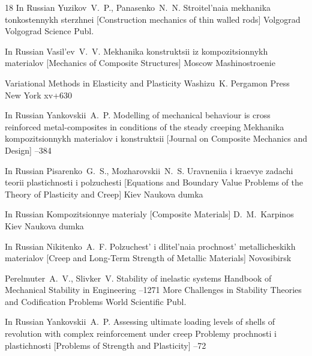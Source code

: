 \begin{thebibliography}{18}
\lang In Russian
\by Yuzikov~V.~P., Panasenko~N.~N.
\book Stroitel'naia mekhanika tonkostennykh sterzhnei \rm [Construction mechanics of thin walled rods]
\publaddr Volgograd
\publ Volgograd Science Publ.


\lang In Russian
\by Vasil'ev~V.~V.
\book Mekhanika konstruktsii iz kompozitsionnykh materialov \rm [Mechanics of Composite Structures]
\publaddr Moscow
\publ Mashinostroenie


\book Variational Methods in Elasticity and Plasticity
\by Washizu~K.
\publ Pergamon Press
\publaddr New York
\totalpages xv+630


\lang In Russian
\by Yankovskii~A.~P.
\paper Modelling of mechanical behaviour is cross reinforced metal-composites in conditions of the steady creeping
\jour Mekhanika kompozitsionnykh materialov i konstruktsii \rm [Journal on Composite Mechanics and Design]
--384


\lang In Russian
\by Pisarenko~G.~S., Mozharovskii~N.~S.
\book Uravneniia i kraevye zadachi teorii plastichnosti i polzuchesti \rm [Equations and Boundary Value Problems of the Theory of Plasticity and Creep]
\publaddr Kiev
\publ Naukova dumka


\lang In Russian
\book Kompozitsionnye materialy \rm [Composite Materials]
\ed D.~M.~Karpinos
\publaddr Kiev
\publ Naukova dumka

\lang In Russian
\by Nikitenko~A.~F.
\book Polzuchest' i dlitel'naia prochnost' metallicheskikh materialov \rm [Creep and Long-Term Strength of Metallic Materials]
\publaddr Novosibirsk


\by Perelmuter~A.~V., Slivker~V. 
\paper Stability of inelastic systems
\inbook  Handbook of Mechanical Stability in Engineering
--1271
\volinfo More Challenges in Stability Theories and Codification Problems 
\publ World Scientific Publ.

\newpage

\lang In Russian
\by Yankovskii~A.~P.
\paper Assessing ultimate loading levels of shells of revolution with complex reinforcement under creep
\jour Problemy prochnosti i plastichnosti \rm [Problems of Strength and Plasticity]
--72

\end{thebibliography}

\EngDate

\newpage
\Russian

%
